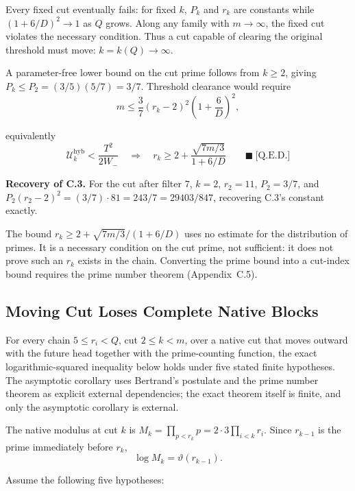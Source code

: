 Every fixed cut eventually fails: for fixed $k$, $P_k$ and $r_k$ are constants
while $(1+6/D)^2\to1$ as $Q$ grows. Along any family with $m\to\infty$, the
fixed cut violates the necessary condition. Thus a cut capable of clearing the
original threshold must move: $k=k(Q)\to\infty$.

A parameter-free lower bound on the cut prime follows from $k\ge2$, giving
$P_k\le P_2=(3/5)(5/7)=3/7$. Threshold clearance would require
\begin{equation*}
m\le\frac37(r_k-2)^2\left(1+\frac6D\right)^2,
\end{equation*}

equivalently
\begin{equation*}
\mathcal U_k^{\mathrm{hyb}}\lt\frac{T^2}{2W_-}
\quad\Longrightarrow\quad
r_k\ge2+\frac{\sqrt{7m/3}}{1+6/D}
\qquad\blacksquare\ \text{[Q.E.D.]}
\end{equation*}

\textbf{Recovery of C.3.} For the cut after filter $7$, $k=2$, $r_2=11$,
$P_2=3/7$, and $P_2(r_2-2)^2=(3/7)\cdot81=243/7=29403/847$, recovering
C.3's constant exactly.

The bound $r_k\ge2+\sqrt{7m/3}/(1+6/D)$ uses no estimate for
the distribution of primes. It is a necessary condition on the cut prime, not
sufficient: it does not prove such an $r_k$ exists in the chain. Converting
the prime bound into a cut-index bound requires the prime number theorem
(Appendix~C.5).

\subsection{Moving Cut Loses Complete Native Blocks}
\label{sec:appendix-c-5}

For every chain $5\le r_i<Q$, cut $2\le k<m$, over a native cut that moves
outward with the future head together with the prime-counting function, the
exact logarithmic-squared inequality below holds under five stated finite
hypotheses. The asymptotic corollary uses Bertrand's postulate and the prime
number theorem as explicit external dependencies; the exact theorem itself is
finite, and only the asymptotic corollary is external.

The native modulus at cut $k$ is $M_k=\prod_{p<r_k}p=2\cdot3\prod_{i<k}r_i$.
Since $r_{k-1}$ is the prime immediately before $r_k$,
\begin{equation*}
\log M_k=\vartheta(r_{k-1}).
\end{equation*}

Assume the following five hypotheses:

